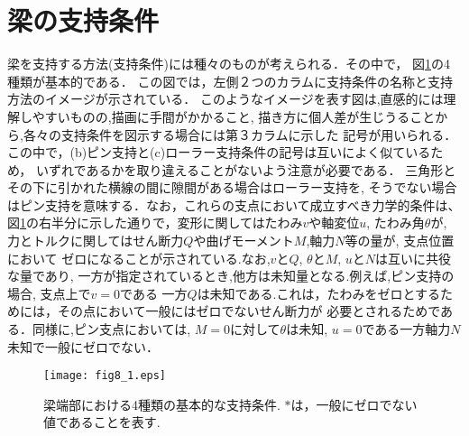 \documentclass[10pt,a4j]{jarticle}
\begin{document}
\section{梁の支持条件}
梁を支持する方法(支持条件)には種々のものが考えられる．その中で， 図\ref{fig:fig8_1}の4種類が基本的である．
この図では，左側２つのカラムに支持条件の名称と支持方法のイメージが示されている．
このようなイメージを表す図は,直感的には理解しやすいものの,描画に手間がかかること, 
描き方に個人差が生じうることから,各々の支持条件を図示する場合には第３カラムに示した
記号が用いられる．この中で，(b)ピン支持と(c)ローラー支持条件の記号は互いによく似ているため，
いずれであるかを取り違えることがないよう注意が必要である．
三角形とその下に引かれた横線の間に隙間がある場合はローラー支持を, そうでない場合
はピン支持を意味する．なお，これらの支点において成立すべき力学的条件は、
図\ref{fig:fig8_1}の右半分に示した通りで，変形に関してはたわみ$v$や軸変位$u$, たわみ角$\theta$が, 
力とトルクに関してはせん断力$Q$や曲げモーメント$M$,軸力$N$等の量が, 支点位置において
ゼロになることが示されている.なお,$v$と$Q$, $\theta$と$M$, $u$と$N$は互いに共役な量であり,
一方が指定されているとき,他方は未知量となる.例えば,ピン支持の場合, 支点上で$v=0$である
一方$Q$は未知である.これは，たわみをゼロとするためには，その点において一般にはゼロでないせん断力が
必要とされるためである．同様に,ピン支点においては, $M=0$に対して$\theta$は未知, 
$u=0$である一方軸力$N$未知で一般にゼロでない．
\begin{figure}
	\begin{center}
	\texttt{[image: fig8\_1.eps]} 
	\end{center}
	\caption{梁端部における4種類の基本的な支持条件. $*$は，一般にゼロでない値であることを表す.}
	\label{fig:fig8_1}
\end{figure}
\end{document}
